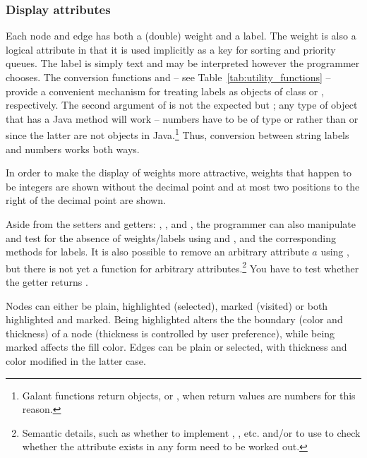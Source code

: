 \subsubsection{Display attributes} \label{sec:display_attributes}

Each node and edge has
both a (double) weight and a label.
The weight
is also a logical
attribute in that
it is used implicitly as a
key for
sorting and priority queues.
The label is simply text and may be interpreted however the programmer
chooses.
The conversion functions 
and 
-- see Table~\ref{tab:utility_functions}
-- provide a convenient mechanism for treating labels as objects of class
 or , respectively.
The second argument of 
is not the expected 
but ;
any type of object that has a Java  method will work
-- numbers have to be of type  or 
rather than  or  since the latter are not objects
in Java.\footnote{
  Galant functions return objects,  or , when
  return values are numbers for this reason.
}
Thus, conversion between string labels and numbers works both ways.

In order to make the display of weights more attractive, weights that happen
to be integers are shown without the decimal point and at most two positions
to the right of the decimal point are shown.

Aside from the setters and getters: ,
\mbox{}, 
and \mbox{}, the programmer can also
manipulate and test for the absence of weights/labels using
 and ,
and the corresponding methods for labels.
It is also possible to remove an arbitrary attribute $a$ using
, but there is not yet a  function for
arbitrary attributes.\footnote{Semantic details, such as whether to implement
  , , etc. and/or to use
   to check whether the attribute exists in any form need
    to be worked out.
}
You have to test whether the getter returns .

Nodes can either be plain, highlighted (selected), marked (visited) or both highlighted and
marked.
Being highlighted alters the
the boundary (color and thickness) of a node (thickness is controlled by user
preference),
while being marked affects the fill color.
Edges can be plain or selected, with thickness and color modified in the
latter case.

